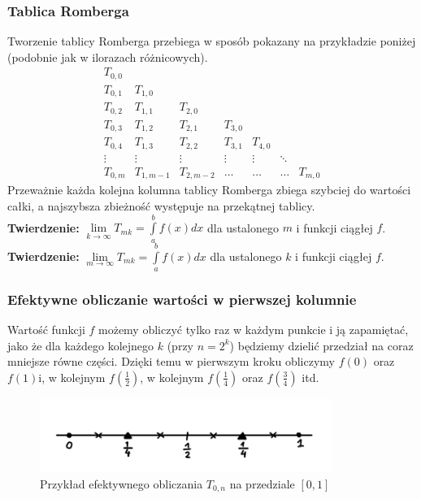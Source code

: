 \documentclass[a4paper,11pt]{article}
\begin{document}
\subsubsection{Tablica Romberga}
Tworzenie tablicy Romberga przebiega w sposób pokazany na przykładzie poniżej (podobnie jak w ilorazach różnicowych).
$$
\begin{array}{ccccccc} %
T_{0,0}	\\	
T_{0,1}	&	T_{1,0}	\\
T_{0,2}	&	T_{1,1}	&	T_{2,0}	\\
T_{0,3}	&	T_{1,2}	&	T_{2,1}	&	T_{3,0}	\\
T_{0,4}	&	T_{1,3}	&	T_{2,2}	&	T_{3,1}	&	T_{4,0}	\\
\vdots 	&	\vdots 	&	\vdots 	&	\vdots 	&	\vdots 	&	\ddots 	\\
T_{0,m}	&	T_{1, m-1}	&	T_{2, m-2}	&	\ldots 		&	\ldots 		& 	\ldots 		& 	T_{m, 0}
\end{array}
$$
\noindent Przeważnie każda kolejna kolumna tablicy Romberga zbiega szybciej do wartości całki, a najszybsza zbieżność występuje na przekątnej tablicy.\\
\textbf{Twierdzenie:} $\lim\limits_{k\to\infty} T_{mk} = \int\limits_{a}^{b} f(x)dx$ dla ustalonego $m$ i funkcji ciągłej $f$.\\
\textbf{Twierdzenie:} $\lim\limits_{m\to\infty} T_{mk} = \int\limits_{a}^{b} f(x)dx$ dla ustalonego $k$ i funkcji ciągłej $f$.

\subsubsection{Efektywne obliczanie wartości w pierwszej kolumnie}
Wartość funkcji $f$ możemy obliczyć tylko raz w każdym punkcie i ją zapamiętać, jako że dla każdego kolejnego $k$ (przy $n=2^k$) będziemy dzielić przedział na coraz mniejsze równe części. Dzięki temu w pierwszym kroku obliczymy $f(0)$ oraz $f(1)$i, w kolejnym $f(\frac{1}{2})$, w kolejnym $f(\frac{1}{4})$ oraz $f(\frac{3}{4})$ itd.
\begin{figure}[H]
\centering
\includegraphics[width=0.85\textwidth]{romberg.png}
\caption{Przykład efektywnego obliczania $T_{0,n}$ na przedziale $[0,1]$}
\label{romberg}
\end{figure}
\end{document}
